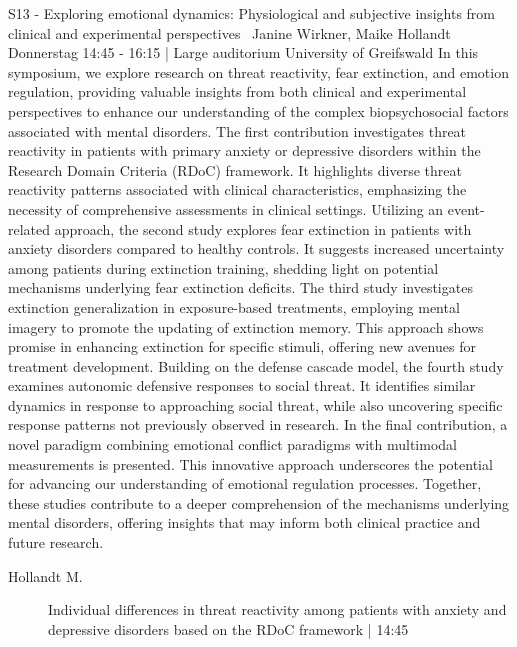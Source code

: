 
            \begin{symposium}
            {S13 - Exploring emotional dynamics: Physiological and subjective insights from clinical and experimental perspectives }
            { Janine Wirkner, Maike Hollandt}
            {Donnerstag 14:45 - 16:15 | Large auditorium}
            {University of Greifswald}
            In this symposium, we explore research on threat reactivity, fear extinction, and emotion regulation, providing valuable insights from both clinical and experimental perspectives to enhance our understanding of the complex biopsychosocial factors associated with mental disorders.
The first contribution investigates threat reactivity in patients with primary anxiety or depressive disorders within the Research Domain Criteria (RDoC) framework. It highlights diverse threat reactivity patterns associated with clinical characteristics, emphasizing the necessity of comprehensive assessments in clinical settings. Utilizing an event-related approach, the second study explores fear extinction in patients with anxiety disorders compared to healthy controls. It suggests increased uncertainty among patients during extinction training, shedding light on potential mechanisms underlying fear extinction deficits. The third study investigates extinction generalization in exposure-based treatments, employing mental imagery to promote the updating of extinction memory. This approach shows promise in enhancing extinction for specific stimuli, offering new avenues for treatment development. Building on the defense cascade model, the fourth study examines autonomic defensive responses to social threat. It identifies similar dynamics in response to approaching social threat, while also uncovering specific response patterns not previously observed in research. In the final contribution, a novel paradigm combining emotional conflict paradigms with multimodal measurements is presented. This innovative approach underscores the potential for advancing our understanding of emotional regulation processes. Together, these studies contribute to a deeper comprehension of the mechanisms underlying mental disorders, offering insights that may inform both clinical practice and future research.
            \begin{description}    
            
                \item [ Hollandt M.] Individual differences in threat reactivity among patients with anxiety and depressive disorders based on the RDoC framework \textcolor{mygray}{ | 14:45}    
                

\end{description}
\end{symposium}
